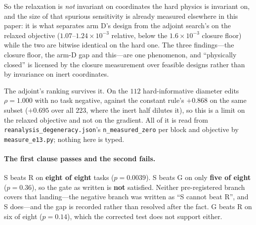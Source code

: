 \documentclass{article}
\begin{document}
So the relaxation is \emph{not} invariant on coordinates the hard physics is invariant on,
and the size of that spurious sensitivity is already measured elsewhere in this paper: it
is what separates arm D's design from the adjoint search's on the relaxed objective
($1.07$--$1.24\times10^{-3}$ relative, below the $1.6\times10^{-3}$ closure floor) while
the two are bitwise identical on the hard one.  The three findings---the closure floor, the
arm-D gap and this---are one phenomenon, and ``physically closed'' is licensed by the
closure measurement over feasible designs rather than by invariance on inert coordinates.

The adjoint's ranking survives it.  On the $112$ hard-informative diameter edits
$\rho = 1.000$ with no task negative, against the constant rule's $+0.868$ on the same
subset ($+0.695$ over all $223$, where the inert half dilutes it), so this is a limit on
the relaxed objective and not on the gradient.  All of it is read from
\texttt{reanalysis\_degeneracy.json}'s \texttt{n\_measured\_zero} per block and objective by
\texttt{measure\_e13.py}; nothing here is typed.

\paragraph{The first clause passes and the second fails.}
S beats R on \textbf{eight of eight} tasks ($p = 0.0039$).  S beats G on only
\textbf{five of eight} ($p = 0.36$), so the gate as written is \textbf{not}
satisfied.  Neither pre-registered branch covers that landing---the negative
branch was written as ``S cannot beat R'', and S does---and the gap is recorded
rather than resolved after the fact.  G beats R on six of eight ($p = 0.14$),
which the corrected test does not support either.
\end{document}
